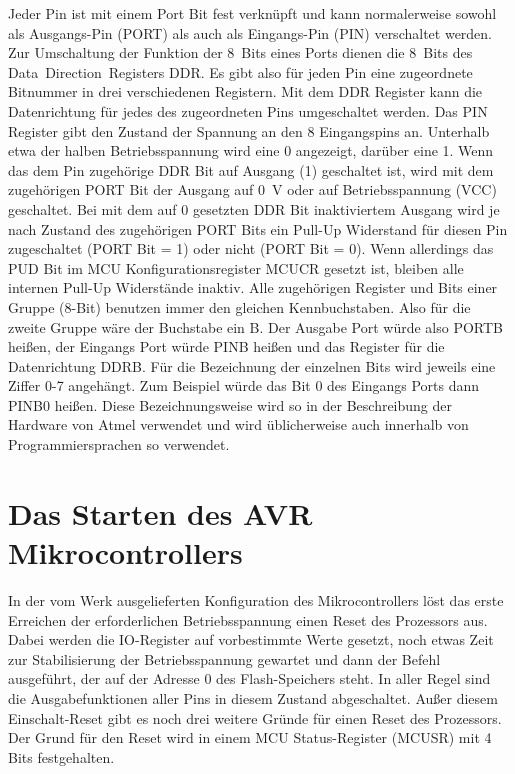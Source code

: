 Jeder Pin ist mit einem Port Bit fest verknüpft und kann normalerweise sowohl
als Ausgangs-Pin (PORT) als auch als Eingangs-Pin (PIN) verschaltet werden.
Zur Umschaltung der Funktion der 8~Bits eines Ports dienen die 8~Bits des
Data~Direction~Registers DDR.
Es gibt also für jeden Pin eine zugeordnete Bitnummer in drei verschiedenen
Registern. Mit dem DDR Register kann die Datenrichtung für jedes des zugeordneten
Pins umgeschaltet werden. Das PIN Register gibt den Zustand der Spannung an
den 8 Eingangspins an. Unterhalb etwa der halben Betriebsspannung wird eine
0 angezeigt, darüber eine 1. Wenn das dem Pin zugehörige DDR Bit auf Ausgang (1)
geschaltet ist, wird mit dem zugehörigen PORT Bit der Ausgang auf 0~V oder
auf Betriebsspannung (VCC) geschaltet. 
Bei mit dem auf 0 gesetzten DDR Bit inaktiviertem Ausgang wird je nach Zustand
des zugehörigen PORT Bits ein Pull-Up Widerstand für diesen Pin zugeschaltet
(PORT Bit = 1) oder nicht (PORT Bit = 0). Wenn allerdings das PUD Bit im
MCU Konfigurationsregister MCUCR gesetzt ist, bleiben alle internen Pull-Up
Widerstände inaktiv.
Alle zugehörigen Register und Bits einer Gruppe (8-Bit) benutzen immer den
gleichen Kennbuchstaben. Also für die zweite Gruppe wäre der Buchstabe ein B.
Der Ausgabe Port würde also PORTB heißen, der Eingangs Port würde PINB heißen
und das Register für die Datenrichtung DDRB. Für die Bezeichnung der einzelnen
Bits wird jeweils eine Ziffer 0-7 angehängt. Zum Beispiel würde das Bit 0
des Eingangs Ports dann PINB0 heißen.
Diese Bezeichnungsweise wird so in der Beschreibung der Hardware von Atmel verwendet
und wird üblicherweise auch innerhalb von Programmiersprachen so verwendet.

\section{Das Starten des AVR Mikrocontrollers}

In der vom Werk ausgelieferten Konfiguration des Mikrocontrollers löst das erste 
Erreichen der erforderlichen Betriebsspannung einen Reset des Prozessors aus.
Dabei werden die IO-Register auf vorbestimmte Werte gesetzt, noch etwas Zeit
zur Stabilisierung der Betriebsspannung gewartet und dann der Befehl ausgeführt,
der auf der Adresse 0 des Flash-Speichers steht.
In aller Regel sind die Ausgabefunktionen aller Pins in diesem Zustand abgeschaltet.
Außer diesem Einschalt-Reset gibt es noch drei weitere Gründe für einen Reset
des Prozessors. Der Grund für den Reset wird in einem MCU Status-Register (MCUSR)
mit 4 Bits festgehalten.

